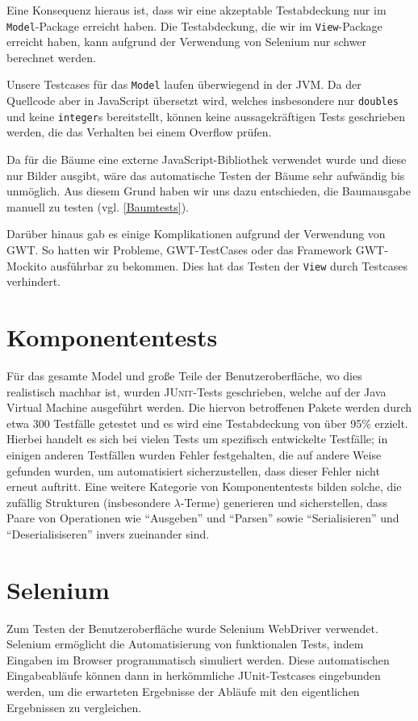 \documentclass[parskip=full,11pt,openany]{scrreprt}
\begin{document}
Eine Konsequenz hieraus ist, dass wir eine akzeptable Testabdeckung nur im
\texttt{Model}-Package erreicht haben. Die Testabdeckung, die wir im
\texttt{View}-Package erreicht haben, kann aufgrund der Verwendung von Selenium
nur schwer berechnet werden.

Unsere Testcases für das \texttt{Model} laufen überwiegend in der JVM. Da der
Quellcode aber in JavaScript übersetzt wird, welches insbesondere nur
\texttt{doubles} und keine \texttt{integer}s bereitstellt, können keine
aussagekräftigen Tests geschrieben werden, die das Verhalten bei einem Overflow
prüfen.

Da für die Bäume eine externe JavaScript-Bibliothek verwendet wurde und diese
nur Bilder ausgibt, wäre das automatische Testen der Bäume sehr aufwändig bis
unmöglich. Aus diesem Grund haben wir uns dazu entschieden, die Baumausgabe
manuell zu testen (vgl. \ref{Baumtests}).

Darüber hinaus gab es einige Komplikationen aufgrund der Verwendung von GWT.
So hatten wir Probleme, GWT-TestCases oder das Framework GWT-Mockito ausführbar
zu bekommen. Dies hat das Testen der \texttt{View} durch Testcases verhindert.

\section{Komponententests}
Für das gesamte Model und große Teile der Benutzeroberfläche, wo dies realistisch
machbar ist, wurden \textsc{JUnit}-Tests geschrieben, welche auf der Java Virtual
Machine ausgeführt werden. Die hiervon betroffenen Pakete werden durch etwa 300
Testfälle getestet und es wird eine Testabdeckung von über 95\% erzielt. Hierbei
handelt es sich bei vielen Tests um spezifisch entwickelte Testfälle; in einigen
anderen Testfällen wurden Fehler festgehalten, die auf andere Weise gefunden
wurden, um automatisiert sicherzustellen, dass dieser Fehler nicht erneut
auftritt. Eine weitere Kategorie von Komponententests bilden solche, die zufällig Strukturen
(insbesondere $\lambda$-Terme) generieren und sicherstellen, dass Paare von
Operationen wie \enquote{Ausgeben} und \enquote{Parsen} sowie \enquote{Serialisieren}
und \enquote{Deserialisiseren} invers zueinander sind.

\section{Selenium}
Zum Testen der Benutzeroberfläche wurde Selenium WebDriver verwendet. Selenium ermöglicht die Automatisierung von funktionalen Tests, indem Eingaben im Browser programmatisch simuliert werden. Diese automatischen Eingabeabläufe können dann in herkömmliche JUnit-Testcases eingebunden werden, um die erwarteten Ergebnisse der Abläufe mit den eigentlichen Ergebnissen zu vergleichen.
\end{document}
